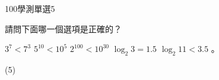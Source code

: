     \begin{QUESTION}
        \begin{ExamInfo}{100}{學測}{單選}{5}
        \end{ExamInfo}
        \begin{ExamAnsRateInfo}{67}{94}{77}{30}
        \end{ExamAnsRateInfo}
        \begin{QBODY}
            請問下面哪一個選項是正確的？ 
		\begin{QOPS} 
			\QOP $3^7 < 7^3$ 
			\QOP $5^{10} < 10^{5}$ 
			\QOP $2^{100} < 10^{30}$ 
			\QOP $\log_2{3} = 1.5$ 
			\QOP $\log_2{11} < 3.5$ 。
		\end{QOPS}
        \end{QBODY}
        \begin{QFROMS}
        \end{QFROMS}
        \begin{QTAGS}\end{QTAGS}
        \begin{QANS}
            (5)
        \end{QANS}
        \begin{QSOLLIST}
        \end{QSOLLIST}
        \begin{QEMPTYSPACE}
        \end{QEMPTYSPACE}
    \end{QUESTION}
